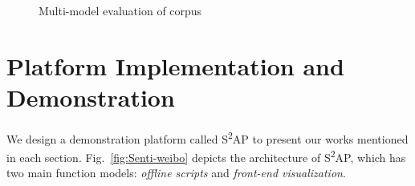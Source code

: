 \documentclass[runningheads]{llncs}
\begin{document}
\begin{figure}[ht]
\vspace{-0.5cm}   %
\centering
{}
\caption{Multi-model evaluation of corpus}
\label{fig:corpus-evaluation}
\end{figure}

\section{Platform Implementation and Demonstration}
We design a demonstration platform called S\textsuperscript{2}AP to present our works mentioned in each section. Fig.~\ref{fig:Senti-weibo} depicts the architecture of S\textsuperscript{2}AP, which has two main function models: \textit{offline scripts} and \textit{front-end visualization}.
\end{document}
